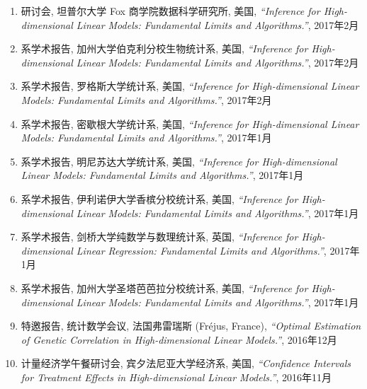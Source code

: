 \documentclass[margin, line]{res}
\begin{document}
\begin{resume}
\begin{enumerate}
            \item 研讨会, 坦普尔大学 Fox 商学院数据科学研究所, 美国, 
                {\it ``Inference for High-dimensional Linear Models: Fundamental Limits and Algorithms.''}, 
                2017年2月

            \item 系学术报告, 加州大学伯克利分校生物统计系, 美国, {\it ``Inference for High-dimensional Linear Models: Fundamental Limits and Algorithms.''}, 
                2017年2月

            \item 系学术报告, 罗格斯大学统计系, 美国, {\it ``Inference for High-dimensional Linear Models: Fundamental Limits and Algorithms.''}, 
                2017年2月

            \item 系学术报告, 密歇根大学统计系, 美国, {\it ``Inference for High-dimensional Linear Models: Fundamental Limits and Algorithms.''}, 
                2017年1月

            \item 系学术报告, 明尼苏达大学统计系, 美国, {\it ``Inference for High-dimensional Linear Models: Fundamental Limits and Algorithms.''}, 
                2017年1月

            \item 系学术报告, 伊利诺伊大学香槟分校统计系, 美国, {\it ``Inference for High-dimensional Linear Models: Fundamental Limits and Algorithms.''}, 
                2017年1月

            \item 系学术报告, 剑桥大学纯数学与数理统计系, 英国, {\it ``Inference for High-dimensional Linear Regression: Fundamental Limits and Algorithms.''}, 
                2017年1月

            \item 系学术报告, 加州大学圣塔芭芭拉分校统计系, 美国, 
                {\it ``Inference for High-dimensional Linear Models: Fundamental Limits and Algorithms.''}, 
                2017年1月

            \item 特邀报告, 统计数学会议, 法国弗雷瑞斯 (Fr{\'e}jus, France), {\it ``Optimal Estimation of Genetic Correlation in High-dimensional Linear Models.''}, 
                2016年12月

            \item 计量经济学午餐研讨会, 宾夕法尼亚大学经济系, 美国, {\it ``Confidence Intervals for Treatment Effects in High-dimensional Linear Models.''}, 
                2016年11月
		\end{enumerate}


\end{resume}
\end{document}
